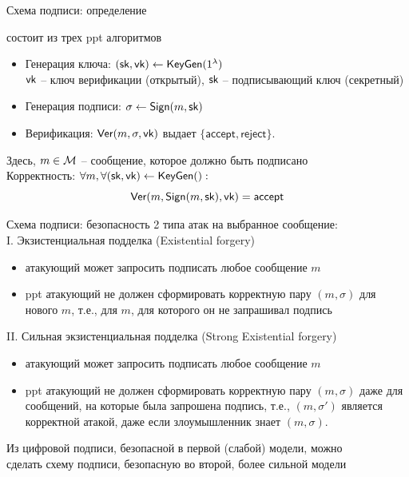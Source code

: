 \documentclass[usenames,dvipsnames,8pt,aspectratio=169]{beamer}
\begin{document}
\begin{frame}{Схема подписи: определение}
\Large

{\color{Orange}{Схема подписи}} состоит из трех ppt алгоритмов
\begin{itemize}
	\itemsep 10pt
	\item Генерация ключа: $(\textsf{sk}, \textsf{vk}) \leftarrow \textsf{KeyGen}(1^\lambda)$ \\
	$\textsf{vk}$ -- ключ верификации (открытый), $\textsf{sk}$ -- подписывающий ключ (секретный)
	\item Генерация подписи: $\sigma \leftarrow \textsf{Sign}(m, \textsf{sk})$
	\item Верификация: $\textsf{Ver}(m, \sigma, \textsf{vk})$ выдает $\{\mathsf{accept}, \mathsf{reject}  \}$.
\end{itemize}
\vspace{15pt}
Здесь,  $m \in \mathcal{M}$ -- сообщение, которое должно быть подписано\\[10pt]

{\color{Orange}Корректность}: $\forall m, \forall (\textsf{sk}, \textsf{vk}) \leftarrow \textsf{KeyGen}():$ 
\[
	\textsf{Ver}(m, \textsf{Sign}(m, \textsf{sk}), \textsf{vk})  = \mathsf{accept}
\]
\end{frame}

\begin{frame}{Схема подписи: безопасность}
	\Large
	2 типа атак {\color{Orange} на выбранное сообщение}: \\[10pt]
	{\color{Orange}I. Экзистенциальная подделка (Existential forgery)} \\
	\large 
		\begin{itemize}
			\item атакующий может запросить подписать любое сообщение $m$
			\item ppt атакующий не должен сформировать корректную пару $(m, \sigma)$ для нового $m$, т.е.,  для $m$, для которого он не запрашивал подпись
		\end{itemize}
	\Large 
	\pause
	{\color{Orange}II. Сильная экзистенциальная подделка (Strong Existential forgery)} \\
	\large 
	\begin{itemize}
		\item атакующий может запросить подписать любое сообщение $m$
		\item  ppt атакующий не должен сформировать корректную пару $(m, \sigma)$  {\color{Orange}  даже для сообщений, на которые была запрошена подпись}, т.е., $(m, \sigma')$ является \\ корректной атакой, даже если злоумышленник знает $(m, \sigma)$.
	\end{itemize}

\vspace{10pt}

Из цифровой подписи, безопасной в первой (слабой) модели, можно \\ сделать схему подписи, безопасную во второй, более сильной модели
\end{frame}
\end{document}
